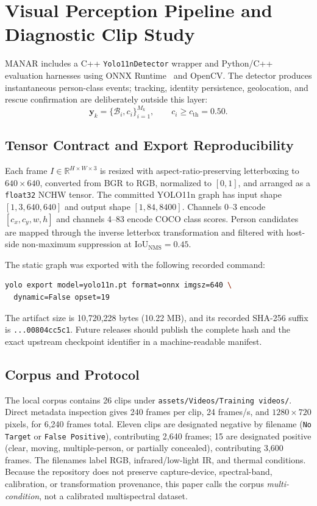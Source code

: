 \section{Visual Perception Pipeline and Diagnostic Clip Study}

MANAR includes a C++ \texttt{Yolo11nDetector} wrapper and Python/C++ evaluation harnesses using ONNX Runtime~\cite{onnxruntime2019} and OpenCV. The detector produces instantaneous person-class events; tracking, identity persistence, geolocation, and rescue confirmation are deliberately outside this layer:
\begin{equation}
\mathbf{y}_k = \{\mathcal{B}_i,c_i\}_{i=1}^{M_k}, \qquad c_i \ge c_{\mathrm{th}}=0.50.
\end{equation}

\subsection{Tensor Contract and Export Reproducibility}

Each frame $I\in\mathbb{R}^{H\times W\times3}$ is resized with aspect-ratio-preserving letterboxing to $640\times640$, converted from BGR to RGB, normalized to $[0,1]$, and arranged as a \texttt{float32} NCHW tensor. The committed YOLO11n graph has input shape $[1,3,640,640]$ and output shape $[1,84,8400]$. Channels 0--3 encode $[c_x,c_y,w,h]$ and channels 4--83 encode COCO class scores. Person candidates are mapped through the inverse letterbox transformation and filtered with host-side non-maximum suppression at $\mathrm{IoU}_{\mathrm{NMS}}=0.45$.

The static graph was exported with the following recorded command:
\begin{lstlisting}[language=bash]
yolo export model=yolo11n.pt format=onnx imgsz=640 \
  dynamic=False opset=19
\end{lstlisting}
The artifact size is 10,720,228 bytes (10.22 MB), and its recorded SHA-256 suffix is \texttt{...00804cc5c1}. Future releases should publish the complete hash and the exact upstream checkpoint identifier in a machine-readable manifest.

\subsection{Corpus and Protocol}

The local corpus contains 26 clips under \texttt{assets/Videos/Training videos/}. Direct metadata inspection gives 240 frames per clip, 24 frames/s, and $1280\times720$ pixels, for 6,240 frames total. Eleven clips are designated negative by filename (\texttt{No Target} or \texttt{False Positive}), contributing 2,640 frames; 15 are designated positive (clear, moving, multiple-person, or partially concealed), contributing 3,600 frames. The filenames label RGB, infrared/low-light IR, and thermal conditions. Because the repository does not preserve capture-device, spectral-band, calibration, or transformation provenance, this paper calls the corpus \emph{multi-condition}, not a calibrated multispectral dataset.

